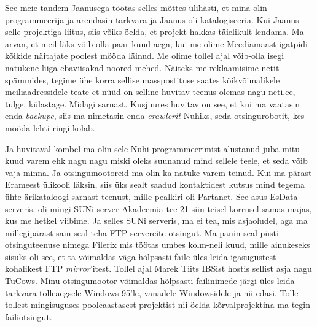 
See meie tandem Jaanusega töötas selles mõttes ülihästi, et mina olin  programmeerija ja arendasin tarkvara ja Jaanus oli  katalogiseeria.  Kui Jaanus selle projektiga liitus, siis võiks öelda, et projekt hakkas täielikult lendama. Ma arvan, et meil läks võib-olla paar kuud aega, kui me olime Meediamaast igatpidi kõikide näitajate poolest mööda läinud. Me olime tollel ajal võib-olla isegi natukene liiga ebaviisakad noored mehed. Näiteks me reklaamisime netit spämmides, tegime  ühe korra sellise masspostituse saates kõikvõimalikele meiliaadressidele teate et nüüd on selline huvitav teenus olemas nagu neti.ee, tulge, külastage. Midagi sarnast. Kusjuures huvitav on see, et kui ma vaatasin enda \emph{backupe}, siis ma nimetasin enda \emph{crawlerit} Nuhiks, seda otsingurobotit, kes mööda lehti ringi kolab. 

Ja huvitaval kombel ma olin sele Nuhi programmeerimist alustanud juba mitu kuud varem ehk nagu nagu miski oleks suunanud mind sellele teele, et seda võib vaja minna. Ja  otsingumootoreid ma olin ka natuke varem teinud. Kui ma pärast Erameest  ülikooli läksin, siis  üks sealt saadud kontaktidest kutsus mind tegema ühte ärikataloogi sarnast teenust,  mille pealkiri oli Partanet. See asus EsData serveris, oli mingi SUNi server Akadeemia tee 21 siin teisel korrusel samas majas, kus me hetkel viibime. Ja selles SUNi serveris, ma ei tea, mis asjaoludel, aga ma millegipärast sain seal teha FTP servereite otsingut.  Ma panin seal püsti otsinguteenuse nimega Filerix mis töötas umbes kolm-neli kuud, mille ainukeseks sisuks oli see, et ta võimaldas väga hõlpsasti faile üles leida igasugustest kohalikest FTP \emph{mirror}'itest. Tollel ajal  Marek Tiits IBSist hostis sellist asja nagu TuCows. Minu  otsingumootor võimaldas hõlpsasti failinimede järgi üles leida tarkvara tolleaegsele Windows 95'le, vanadele Windowsidele ja nii edasi. Tolle tollest mingisuguses pooleaastasest projektist nii-öelda kõrvalprojektina ma tegin failiotsingut.

